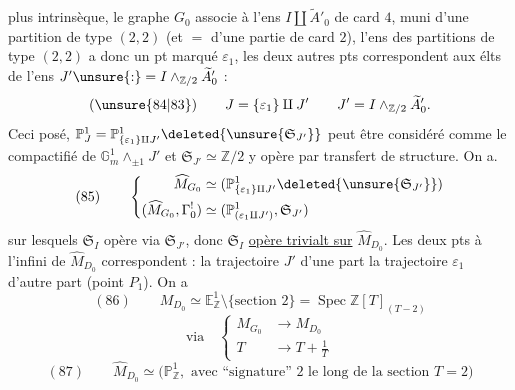 plus intrinsèque, le graphe $G_0$  associe à l'ens $I\amalg\widetilde A'_0$ de card $4$, muni d'une partition de type $(2,2)$ (et $=$ d'une partie  de card $2$), l'ens  des  partitions de type $(2,2)$ a donc un pt marqué $\varepsilon_1$, les deux autres pts correspondent aux élts de l'ens $J'\unsure{:}=I\wedge_{\mathbb Z/2}\widetilde A'_0$ :
\[
(\unsure{84|83})\qquad J=\{\varepsilon_1\}\amalg J'\qquad J'=I\wedge_{\mathbb Z/2}\widetilde A'_0.
\]
Ceci posé, $\mathbb P^1_J=\mathbb P^1_{\{\varepsilon_1\}\amalg J'}\deleted{\unsure{\mathfrak S_{J'}}}$ peut être considéré comme le compactifié de $\mathbb G_m^{1}\wedge_{\pm1}J'$ et  $\mathfrak S_{J'}\simeq\mathbb Z/2$ y opère par transfert de structure. On a.
\[
(85)\qquad
\left\{\begin{aligned}
\widehat M_{G_0}&\simeq(\mathbb P^1_{\{\varepsilon_1\}\amalg J'}\deleted{\unsure{\mathfrak S_{J'}}})\\
(\widehat M_{G_0},\Gamma^!_0)&\simeq(\mathbb P^1_{(\varepsilon_1\amalg J')},\mathfrak S_{J'})
\end{aligned}\right.
\]
sur lesquels $\mathfrak S_I$ opère via $\mathfrak S_{J'}$, donc $\mathfrak S_I$ \uline{opère trivialt sur} $\widehat M_{D_0}$. Les deux pts à l'infini de $\widehat M_{D_0}$ correspondent : la trajectoire $J'$ d'une part  la trajectoire $\varepsilon_1$ d'autre part (point $P_1$). On a
\[
(86)\qquad M_{D_0}\simeq\mathbb E^1_{\mathbb Z}\setminus\{\text{section }2\}=\operatorname{Spec}\mathbb Z[T]_{(T-2)}
\]
\[
\text{via}\quad\left\{\begin{aligned}M_{G_0}&\longrightarrow M_{D_0}\\ T&\longrightarrow T+\frac1T\end{aligned}\right.
\]
\[
(87)\qquad\widehat M_{D_0}\simeq\bigl(\mathbb P^1_{\mathbb Z},\text{ avec ``signature'' }2\text{ le long de la section }T=2\bigr)
\]
